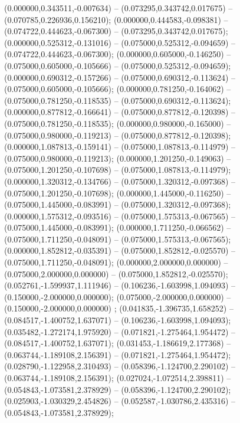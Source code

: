  (0.000000,0.343511,-0.007634) -- (0.073295,0.343742,0.017675) -- (0.070785,0.226936,0.156210);
 (0.000000,0.444583,-0.098381) -- (0.074722,0.444623,-0.067300) -- (0.073295,0.343742,0.017675);
 (0.000000,0.525312,-0.131016) -- (0.075000,0.525312,-0.094659) -- (0.074722,0.444623,-0.067300);
 (0.000000,0.605000,-0.146250) -- (0.075000,0.605000,-0.105666) -- (0.075000,0.525312,-0.094659);
 (0.000000,0.690312,-0.157266) -- (0.075000,0.690312,-0.113624) -- (0.075000,0.605000,-0.105666);
 (0.000000,0.781250,-0.164062) -- (0.075000,0.781250,-0.118535) -- (0.075000,0.690312,-0.113624);
 (0.000000,0.877812,-0.166641) -- (0.075000,0.877812,-0.120398) -- (0.075000,0.781250,-0.118535);
 (0.000000,0.980000,-0.165000) -- (0.075000,0.980000,-0.119213) -- (0.075000,0.877812,-0.120398);
 (0.000000,1.087813,-0.159141) -- (0.075000,1.087813,-0.114979) -- (0.075000,0.980000,-0.119213);
 (0.000000,1.201250,-0.149063) -- (0.075000,1.201250,-0.107698) -- (0.075000,1.087813,-0.114979);
 (0.000000,1.320312,-0.134766) -- (0.075000,1.320312,-0.097368) -- (0.075000,1.201250,-0.107698);
 (0.000000,1.445000,-0.116250) -- (0.075000,1.445000,-0.083991) -- (0.075000,1.320312,-0.097368);
 (0.000000,1.575312,-0.093516) -- (0.075000,1.575313,-0.067565) -- (0.075000,1.445000,-0.083991);
 (0.000000,1.711250,-0.066562) -- (0.075000,1.711250,-0.048091) -- (0.075000,1.575313,-0.067565);
 (0.000000,1.852812,-0.035391) -- (0.075000,1.852812,-0.025570) -- (0.075000,1.711250,-0.048091);
 (0.000000,2.000000,0.000000) -- (0.075000,2.000000,0.000000) -- (0.075000,1.852812,-0.025570);
 (0.052761,-1.599937,1.111946) -- (0.106236,-1.603998,1.094093) -- (0.150000,-2.000000,0.000000);
 (0.075000,-2.000000,0.000000) -- (0.150000,-2.000000,0.000000) ;
 (0.041835,-1.396735,1.658252) -- (0.084517,-1.400752,1.637071) -- (0.106236,-1.603998,1.094093);
 (0.035482,-1.272174,1.975920) -- (0.071821,-1.275464,1.954472) -- (0.084517,-1.400752,1.637071);
 (0.031453,-1.186619,2.177368) -- (0.063744,-1.189108,2.156391) -- (0.071821,-1.275464,1.954472);
 (0.028790,-1.122958,2.310493) -- (0.058396,-1.124700,2.290102) -- (0.063744,-1.189108,2.156391);
 (0.027024,-1.072514,2.398811) -- (0.054843,-1.073581,2.378929) -- (0.058396,-1.124700,2.290102);
 (0.025903,-1.030329,2.454826) -- (0.052587,-1.030786,2.435316) -- (0.054843,-1.073581,2.378929);
